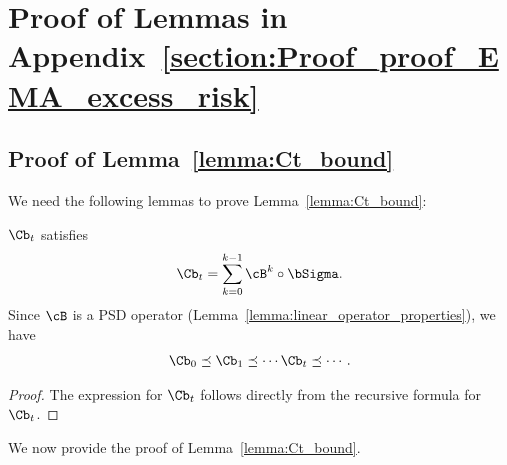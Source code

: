 \documentclass[11pt]{article}
\begin{document}
\section{Proof of Lemmas in Appendix~\ref{section:Proof_proof_EMA_excess_risk}}

\subsection{Proof of Lemma~\ref{lemma:Ct_bound}}\label{subsection:proof_Ct_bound}

We need the following lemmas to prove Lemma~\ref{lemma:Ct_bound}:
\begin{lemma}\label{lemma:Ct_increasing}
$\Cb_t$ satisfies
\begin{align*}
\Cb_t=\sum_{k=0}^{k-1}\cB^k\circ\bSigma.
\end{align*}
Since $\cB$ is a PSD operator (Lemma~\ref{lemma:linear_operator_properties}), we have
\begin{align*}
\Cb_0\preceq\Cb_1\preceq\cdots\Cb_t\preceq\cdots.
\end{align*}
\end{lemma}
\begin{proof}
The expression for $\Cb_t$ follows directly from the recursive formula for $\Cb_t$.
\end{proof}
We now provide the proof of Lemma~\ref{lemma:Ct_bound}.
\end{document}
